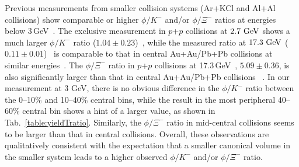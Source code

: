 \documentclass[aps,tightenlines,superscriptaddress,twocolumn]{revtex4-1}
\begin{document}
Previous measurements from smaller collision systems (Ar+KCl and Al+Al collisions) show comparable or higher $\phi/K^-$ and/or $\phi/\Xi^-$ ratios at energies below 3\,GeV~\cite{HADES_phi_ArKCl:2009,Xi_ArKCl_HADES:2009,FOPI_phi_NiNi:2015,FOPI_phi_AlAl:2016}. The exclusive measurement in $p$+$p$ collisions at $\textup{2.7 GeV}$ shows a much larger $\phi/K^-$ ratio ($1.04\pm0.23$)~\cite{ANKE_phi:2008}, while the measured ratio at $\textup{17.3 GeV}$ ($0.11\pm0.01$)~\cite{NA61SHINE_pp_piKp:2017,NA61SHINE_pp_phi:2020} is comparable to that in central Au+Au/Pb+Pb collisions at similar energies~\cite{NA49_phi:2008,star_bes_strangeness:2020}. The $\phi/\Xi^-$ ratio in $p$+$p$ collisions at 17.3\,GeV~\cite{NA61SHINE_pp_phi:2020,NA61SHINE_pp_Xi:2020}, $5.09\pm0.36$, is also significantly larger than that in central Au+Au/Pb+Pb collisions ~\cite{NA49_phi:2008,NA49_Xi:2008,star_bes_strangeness:2020}. In our measurement at 3 GeV, there is no obvious difference in the $\phi/K^-$ ratio between the \textup{0--10\%} and \textup{10--40\%} central bins, while the result in the most peripheral 40--60\% central bin shows a hint of a larger value, as shown in Tab.~\ref{table:yieldTratio}. Similarly, the $\phi/\Xi^-$ ratio in mid-central collisions seems to be larger than that in central collisions. Overall, these observations are qualitatively consistent with the expectation that a smaller canonical volume in the smaller system leads to a higher observed $\phi/K^-$ and/or $\phi/\Xi^-$ ratio.
\end{document}
